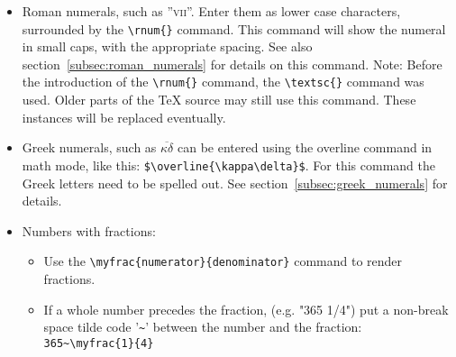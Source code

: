 \documentclass{report}
\begin{document}
\begin{itemize}
\item Roman numerals, such as ''\textsc{vii}''.
Enter them as lower case characters, surrounded by the \verb;\rnum{};
command. This command will show the numeral in small caps,
with the appropriate spacing.
See also section~\ref{subsec:roman_numerals} for details on this command.
Note: Before the introduction of the \verb;\rnum{}; command,
the \verb;\textsc{}; command was used. Older parts of the \TeX{} source
may still use this command. These instances will be replaced eventually.

\item Greek numerals, such as $\overline{\kappa\delta}$ can be entered using
the overline command in math mode, like this: \verb+$\overline{\kappa\delta}$+.
For this command the Greek letters need to be spelled out. See section~\ref{subsec:greek_numerals} for details.
\item Numbers with fractions:
\begin{itemize}
\item Use the \verb+\myfrac{numerator}{denominator}+ command to render fractions.
\item If a whole number precedes the fraction,
(e.g. "365 1/4")
put a non-break space tilde code '\verb+~+' between the number
and the fraction: \verb+365~\myfrac{1}{4}+ 
\end{itemize}

\end{itemize}

\end{document}
